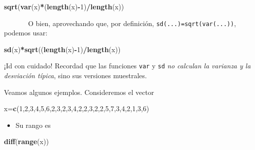 \documentclass[]{book}
\newenvironment{Shaded}{\begin{snugshade}}{\end{snugshade}}
\newcommand{\DecValTok}[1]{\textcolor[rgb]{0.00,0.00,0.81}{#1}}
\newcommand{\KeywordTok}[1]{\textcolor[rgb]{0.13,0.29,0.53}{\textbf{#1}}}
\newcommand{\NormalTok}[1]{#1}
\newcommand{\OperatorTok}[1]{\textcolor[rgb]{0.81,0.36,0.00}{\textbf{#1}}}
\providecommand{\tightlist}{%
  \setlength{\itemsep}{0pt}\setlength{\parskip}{0pt}}
\theoremstyle{definition}
\theoremstyle{definition}
\theoremstyle{definition}
\theoremstyle{remark}
\begin{document}
\begin{Shaded}
\begin{Highlighting}[]
\KeywordTok{sqrt}\NormalTok{(}\KeywordTok{var}\NormalTok{(x)}\OperatorTok{*}\NormalTok{(}\KeywordTok{length}\NormalTok{(x)}\OperatorTok{-}\DecValTok{1}\NormalTok{)}\OperatorTok{/}\KeywordTok{length}\NormalTok{(x))}
\end{Highlighting}
\end{Shaded}

~~~~~~~O bien, aprovechando que, por definición, \texttt{sd(...)=sqrt(var(...))}, podemos usar:

\begin{Shaded}
\begin{Highlighting}[]
\KeywordTok{sd}\NormalTok{(x)}\OperatorTok{*}\KeywordTok{sqrt}\NormalTok{((}\KeywordTok{length}\NormalTok{(x)}\OperatorTok{-}\DecValTok{1}\NormalTok{)}\OperatorTok{/}\KeywordTok{length}\NormalTok{(x))}
\end{Highlighting}
\end{Shaded}

¡Id con cuidado! Recordad que las funciones \texttt{var} y \texttt{sd} \emph{no calculan la varianza y la desviación típica}, sino sus versiones muestrales.

Veamos algunos ejemplos. Consideremos el vector

\begin{Shaded}
\begin{Highlighting}[]
\NormalTok{x=}\KeywordTok{c}\NormalTok{(}\DecValTok{1}\NormalTok{,}\DecValTok{2}\NormalTok{,}\DecValTok{3}\NormalTok{,}\DecValTok{4}\NormalTok{,}\DecValTok{5}\NormalTok{,}\DecValTok{6}\NormalTok{,}\DecValTok{2}\NormalTok{,}\DecValTok{3}\NormalTok{,}\DecValTok{2}\NormalTok{,}\DecValTok{3}\NormalTok{,}\DecValTok{4}\NormalTok{,}\DecValTok{2}\NormalTok{,}\DecValTok{2}\NormalTok{,}\DecValTok{3}\NormalTok{,}\DecValTok{2}\NormalTok{,}\DecValTok{2}\NormalTok{,}\DecValTok{5}\NormalTok{,}\DecValTok{7}\NormalTok{,}\DecValTok{3}\NormalTok{,}\DecValTok{4}\NormalTok{,}\DecValTok{2}\NormalTok{,}\DecValTok{1}\NormalTok{,}\DecValTok{3}\NormalTok{,}\DecValTok{6}\NormalTok{)}
\end{Highlighting}
\end{Shaded}

\begin{itemize}
\tightlist
\item
  Su rango es
\end{itemize}

\begin{Shaded}
\begin{Highlighting}[]
\KeywordTok{diff}\NormalTok{(}\KeywordTok{range}\NormalTok{(x)) }
\end{Highlighting}
\end{Shaded}
\end{document}
